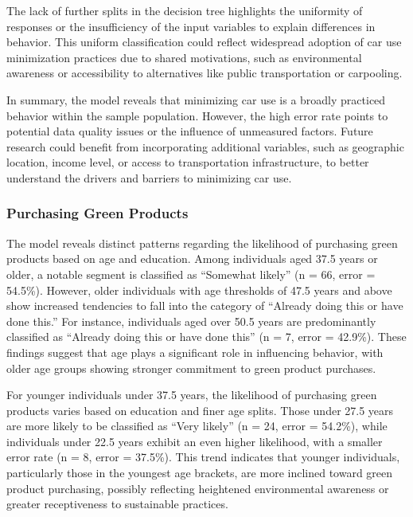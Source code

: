 \documentclass[
  letterpaper,
  DIV=11,
  numbers=noendperiod]{scrartcl}
\begin{document}
The lack of further splits in the decision tree highlights the
uniformity of responses or the insufficiency of the input variables to
explain differences in behavior. This uniform classification could
reflect widespread adoption of car use minimization practices due to
shared motivations, such as environmental awareness or accessibility to
alternatives like public transportation or carpooling.

In summary, the model reveals that minimizing car use is a broadly
practiced behavior within the sample population. However, the high error
rate points to potential data quality issues or the influence of
unmeasured factors. Future research could benefit from incorporating
additional variables, such as geographic location, income level, or
access to transportation infrastructure, to better understand the
drivers and barriers to minimizing car use.

\subsubsection{Purchasing Green
Products}\label{purchasing-green-products}

The model reveals distinct patterns regarding the likelihood of
purchasing green products based on age and education. Among individuals
aged 37.5 years or older, a notable segment is classified as ``Somewhat
likely'' (n = 66, error = 54.5\%). However, older individuals with age
thresholds of 47.5 years and above show increased tendencies to fall
into the category of ``Already doing this or have done this.'' For
instance, individuals aged over 50.5 years are predominantly classified
as ``Already doing this or have done this'' (n = 7, error = 42.9\%).
These findings suggest that age plays a significant role in influencing
behavior, with older age groups showing stronger commitment to green
product purchases.

For younger individuals under 37.5 years, the likelihood of purchasing
green products varies based on education and finer age splits. Those
under 27.5 years are more likely to be classified as ``Very likely'' (n
= 24, error = 54.2\%), while individuals under 22.5 years exhibit an
even higher likelihood, with a smaller error rate (n = 8, error =
37.5\%). This trend indicates that younger individuals, particularly
those in the youngest age brackets, are more inclined toward green
product purchasing, possibly reflecting heightened environmental
awareness or greater receptiveness to sustainable practices.
\end{document}

